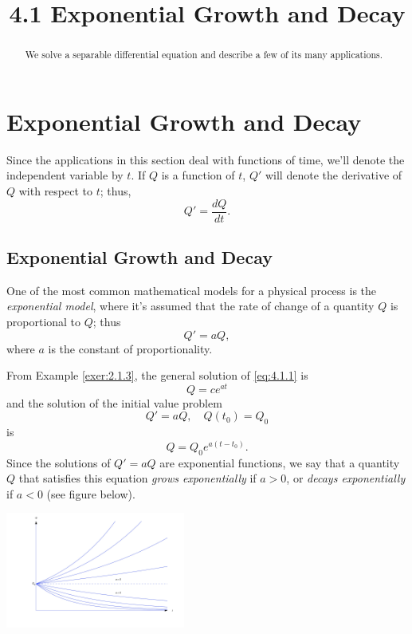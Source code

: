 \documentclass{ximera}
\title{4.1 Exponential Growth and Decay}%
\begin{document}
\begin{abstract}
We solve a separable differential equation and describe a few of its many applications.
\end{abstract}

\maketitle

\section*{Exponential Growth and Decay}

Since the applications in this section deal with functions of time, we'll
 denote the independent variable by $t$. If $Q$ is a function of
$t$, $Q'$ will denote the derivative of $Q$ with respect to $t$;
thus,
$$
Q'=\frac{dQ}{dt}.
$$

\subsection*{Exponential Growth and Decay}

One of the most common mathematical models for a physical process is
the \textit{exponential model}, where it's assumed that the rate
of change of a quantity $Q$ is proportional to $Q$; thus
\begin{equation} \label{eq:4.1.1}
Q'=aQ,
\end{equation}
 where $a$ is the constant of proportionality.

From Example \ref{exer:2.1.3}, the general solution of
\eqref{eq:4.1.1} is
$$
Q=ce^{at}
$$
 and the solution of the initial value problem
$$
Q'=aQ, \quad Q(t_0)=Q_0
$$
 is
\begin{equation} \label{eq:4.1.2}
Q=Q_0e^{a(t-t_0)}.
\end{equation}
Since the solutions of $Q'=aQ$ are exponential functions, we say that
a
quantity $Q$ that satisfies this equation \textit{grows exponentially} if
$a > 0$, or \textit{decays exponentially} if $a < 0$ (see figure below).

\begin{image}
 \includegraphics[height=1.5in]{fig040101.jpg} 
\end{image}
\end{document}
